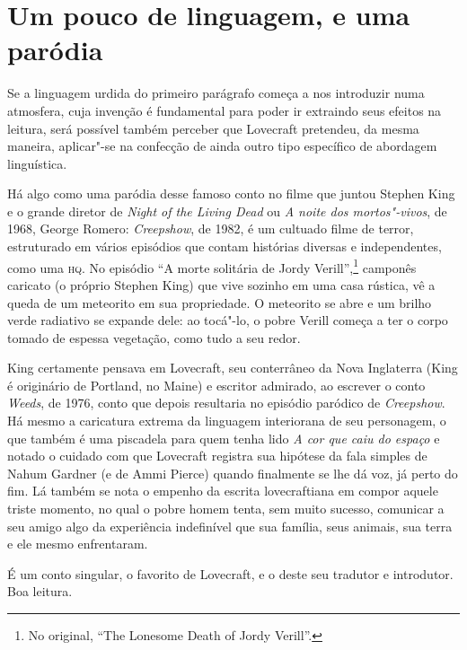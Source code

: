 \section*{Um pouco de linguagem, e uma paródia}

Se a linguagem urdida do primeiro parágrafo começa a nos introduzir numa
atmosfera, cuja invenção é fundamental para poder ir extraindo seus
efeitos na leitura, será possível também perceber que Lovecraft
pretendeu, da mesma maneira, aplicar"-se na confecção de ainda outro tipo
específico de abordagem linguística.

Há algo como uma paródia desse famoso conto no filme que juntou Stephen
King e o grande diretor de \textit{Night of the Living Dead} ou \textit{A noite dos
mortos"-vivos}, de 1968, George Romero: \textit{Creepshow}, de 1982, é um
cultuado filme de terror, estruturado em vários episódios que contam
histórias diversas e independentes, como uma \textsc{hq}. No episódio ``A morte solitária de Jordy Verill'',\footnote{No original, ``The Lonesome Death of Jordy Verill''.}
camponês caricato (o próprio Stephen King) que vive sozinho em uma casa
rústica, vê a queda de um meteorito em sua propriedade. O meteorito se
abre e um brilho verde radiativo se expande dele: ao tocá"-lo, o pobre
Verill começa a ter o corpo tomado de espessa vegetação, como tudo a seu
redor.

King certamente pensava em Lovecraft, seu conterrâneo da Nova Inglaterra
(King é originário de Portland, no Maine) e escritor admirado, ao
escrever o conto \textit{Weeds}, de 1976, conto que depois resultaria no
episódio paródico de \textit{Creepshow}. Há mesmo a caricatura extrema da
linguagem interiorana de seu personagem, o que também é uma piscadela
para quem tenha lido \textit{A cor que caiu do espaço} e notado o cuidado com
que Lovecraft registra sua hipótese da fala simples de Nahum Gardner (e
de Ammi Pierce) quando finalmente se lhe dá voz, já perto do fim. Lá
também se nota o empenho da escrita lovecraftiana em compor aquele
triste momento, no qual o pobre homem tenta, sem muito sucesso,
comunicar a seu amigo algo da experiência indefinível que sua família,
seus animais, sua terra e ele mesmo enfrentaram.

É um conto singular, o favorito de Lovecraft, e o deste seu tradutor e
introdutor. Boa leitura.

